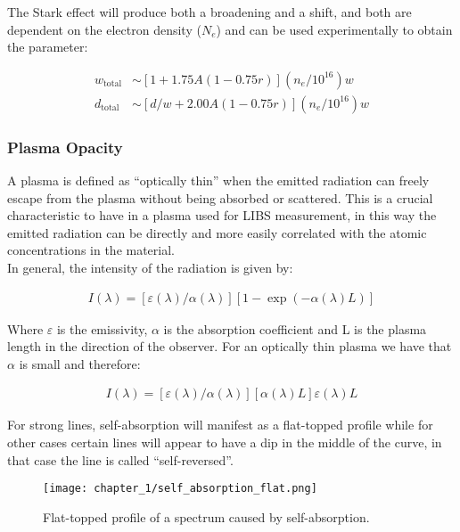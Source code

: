 The Stark effect will produce both a broadening and a shift, and both are dependent on the electron density ($N_e$) and can be used experimentally to obtain the parameter:

\begin{align}
    w_{\mathrm{total}}&\sim\left[1+1.75A\left(1-0.75r\right)\right]\left(n_{e}/{10}^{16}\right)w \label{eq:stark_width} \\ 
    d_{\mathrm{total}}&\sim\left[d/w+2.00A\left(1-0.75r\right)\right]\left(n_{e}/{10}^{16}\right)w \label{eq:stark_shift} 
\end{align}

\subsubsection{Plasma Opacity}
\label{subsubsec:plasma_opacity}
A plasma is defined as “optically thin” when the emitted radiation can freely escape from the plasma without being absorbed or scattered. This is a crucial characteristic to have in a plasma used for LIBS measurement, in this way the emitted radiation can be directly and more easily correlated with the atomic concentrations in the material.
\\
In general, the intensity of the radiation is given by:

\begin{align}
  I\left(\lambda\right)=\left[\varepsilon\left(\lambda\right)/\alpha\left(\lambda\right)\right]\left[1-\exp{\left(-\alpha\left(\lambda\right)L\right)}\right] \label{eq:intensity_radiation}  
\end{align}

Where $\varepsilon$ is the emissivity, $\alpha$ is the absorption coefficient and L is the plasma length in the direction of the observer. For an optically thin plasma we have that $\alpha$ is small and therefore:

\begin{align}
   I(\lambda)=[\varepsilon(\lambda)/\alpha(\lambda)][\alpha(\lambda)L]\varepsilon(\lambda)L \label{eq:intensity_radiation_approx}  
\end{align}

For strong lines, self-absorption will manifest as a flat-topped profile while for other cases certain lines will appear to have a dip in the middle of the curve, in that case the line is called “self-reversed”. 

\begin{figure}[H]
    \centering
    \texttt{[image: chapter\_1/self\_absorption\_flat.png]}
    \caption{Flat-topped profile of a spectrum caused by self-absorption.}
    \label{fig:self_absorbed_flat}
\end{figure}

